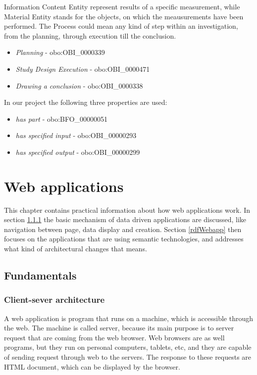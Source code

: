 Information Content Entity represent results of a specific measurement, while Material Entity stands for the objects, on which the meausurements have been performed. 
The Process could mean any kind of step within an investigation, from the planning, through execution till the conclusion.

\begin{itemize}
	\item  \textit{Planning} - obo:OBI\_0000339
	\item  \textit{Study Design Execution} - obo:OBI\_0000471
	\item  \textit{Drawing a conclusion} - obo:OBI\_0000338
\end{itemize}


In our project the following three properties are used:

\begin{itemize}
	\item  \textit{has part} - obo:BFO\_00000051
	\item  \textit{has specified input} - obo:OBI\_00000293
	\item  \textit{has specified output} - obo:OBI\_00000299
\end{itemize}


\section{Web applications}

This chapter contains practical information about how web applications work. In section \ref{clientServer} the basic mechanism of data driven applications are discussed, like navigation between page, data display and creation. Section \ref{rdfWebapp} then focuses on the applications that are using semantic technologies, and addresses what kind of architectural changes that means.


\subsection{Fundamentals} \label{fundamentals}

\subsubsection{Client-sever architecture} \label{clientServer}


A web application is program that runs on a machine, which is accessible through the web. The machine is called server, because its main purpose is to server request that are coming from the web browser. Web browsers are as well programs, but they run on personal computers, tablets, etc, and they are capable of sending request through web to the servers. The response to these requests are HTML document, which can be displayed by the browser. 

